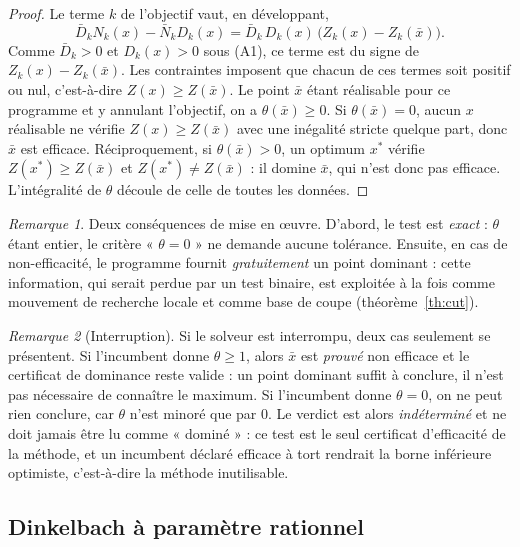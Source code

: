 \documentclass[11pt,a4paper]{article}
\theoremstyle{plain}
\theoremstyle{remark}
\newtheorem{remark}{Remarque}
\newcommand{\Zk}{Z_k}
\newcommand{\Nk}{N_k}
\newcommand{\Dk}{D_k}
\begin{document}
\begin{proof}
Le terme $k$ de l'objectif vaut, en développant,
\[
  \bar D_k\Nk(x)-\bar N_k\Dk(x)=\bar D_k\,\Dk(x)\,\bigl(\Zk(x)-\Zk(\bar x)\bigr).
\]
Comme $\bar D_k>0$ et $\Dk(x)>0$ sous (A1), ce terme est du signe de
$\Zk(x)-\Zk(\bar x)$. Les contraintes imposent que chacun de ces termes soit
positif ou nul, c'est-à-dire $Z(x)\ge Z(\bar x)$. Le point $\bar x$ étant
réalisable pour ce programme et y annulant l'objectif, on a
$\theta(\bar x)\ge 0$. Si $\theta(\bar x)=0$, aucun $x$ réalisable ne vérifie
$Z(x)\ge Z(\bar x)$ avec une inégalité stricte quelque part, donc $\bar x$
est efficace. Réciproquement, si $\theta(\bar x)>0$, un optimum $x^\ast$
vérifie $Z(x^\ast)\ge Z(\bar x)$ et $Z(x^\ast)\ne Z(\bar x)$ : il domine
$\bar x$, qui n'est donc pas efficace. L'intégralité de $\theta$ découle de
celle de toutes les données.
\end{proof}

\begin{remark}
Deux conséquences de mise en \oe uvre. D'abord, le test est \emph{exact} :
$\theta$ étant entier, le critère « $\theta=0$ » ne demande aucune tolérance.
Ensuite, en cas de non-efficacité, le programme fournit \emph{gratuitement}
un point dominant : cette information, qui serait perdue par un test binaire,
est exploitée à la fois comme mouvement de recherche locale et comme base de
coupe (théorème~\ref{th:cut}).
\end{remark}

\begin{remark}[Interruption]\label{rem:interruption}
Si le solveur est interrompu, deux cas seulement se présentent. Si
l'incumbent donne $\theta\ge 1$, alors $\bar x$ est \emph{prouvé} non
efficace et le certificat de dominance reste valide : un point dominant
suffit à conclure, il n'est pas nécessaire de connaître le maximum. Si
l'incumbent donne $\theta=0$, on ne peut rien conclure, car $\theta$ n'est
minoré que par $0$. Le verdict est alors \emph{indéterminé} et ne doit jamais
être lu comme « dominé » : ce test est le seul certificat d'efficacité de la
méthode, et un incumbent déclaré efficace à tort rendrait la borne inférieure
optimiste, c'est-à-dire la méthode inutilisable.
\end{remark}

\subsection{Dinkelbach à paramètre rationnel}
\end{document}
